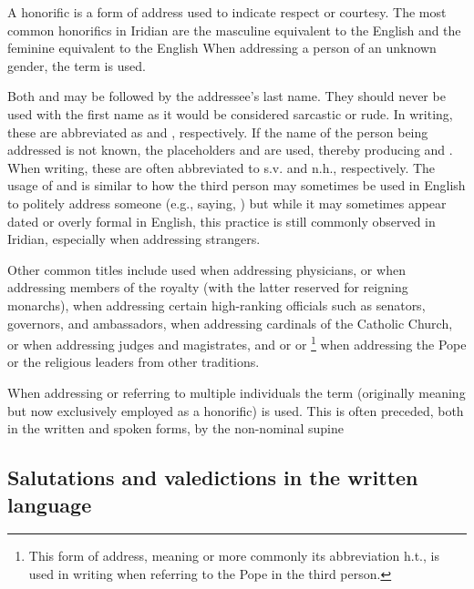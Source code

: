 A {\cscaps honorific} is a form of address used to indicate respect or courtesy. The most common honorifics in
Iridian are the masculine  equivalent to the English  and the feminine
 equivalent to the English  When addressing a person of an unknown
gender, the term  is used.

Both  and  may be followed by the addressee's last name. They should never be used with
the first name as it would be considered sarcastic or rude. In writing, these are abbreviated as 
and , respectively. If the name of the person being addressed is not
known, the placeholders  and  are used, thereby producing 
and . When writing, these are often abbreviated to {\sc s.v.} and {\sc n.h.}, respectively.
The usage of  and  is similar to how the third person may sometimes be used
in English to politely address someone (e.g., saying, ) but while
it may sometimes appear dated or overly formal in English, this practice is still commonly observed
in Iridian, especially when addressing strangers.

Other common titles include  used when addressing physicians,  or 
when addressing members of the royalty (with the latter reserved for reigning monarchs),  when
addressing certain high-ranking officials such as senators, governors, and ambassadors,  when addressing
cardinals of the Catholic Church,  or  when addressing judges and magistrates, and
 or  or \footnote{This form of address, meaning
 or more commonly its abbreviation {\sc h.t.}, is used in writing when referring to the Pope in the
third person.} when addressing the Pope or the religious leaders from other traditions.

When addressing or referring to multiple individuals the term  (originally meaning 
but now exclusively employed as a honorific) is used. This is often preceded, both in the written and spoken forms,
by the non-nominal supine 

\subsection{Salutations and valedictions in the written language}

